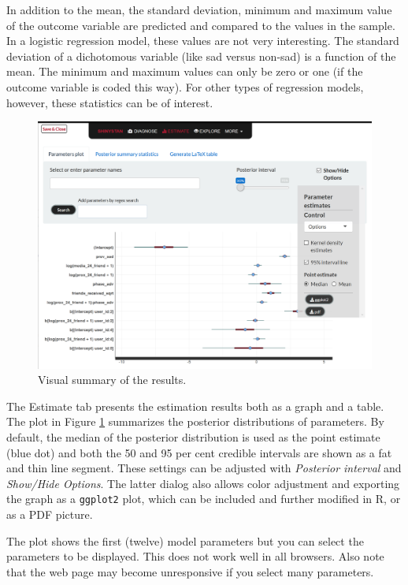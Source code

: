 \documentclass[
  english,
  doc]{apa6}
\begin{document}
In addition to the mean, the standard deviation, minimum and maximum value of the outcome variable are predicted and compared to the values in the sample. In a logistic regression model, these values are not very interesting. The standard deviation of a dichotomous variable (like sad versus non-sad) is a function of the mean. The minimum and maximum values can only be zero or one (if the outcome variable is coded this way). For other types of regression models, however, these statistics can be of interest.

\begin{figure}[H]
\includegraphics[width=1\linewidth]{shinystan5} \caption{Visual summary of the results.}\label{fig:shinystanshot5}
\end{figure}

The Estimate tab presents the estimation results both as a graph and a table. The plot in Figure \ref{fig:shinystanshot5} summarizes the posterior distributions of parameters. By default, the median of the posterior distribution is used as the point estimate (blue dot) and both the 50 and 95 per cent credible intervals are shown as a fat and thin line segment. These settings can be adjusted with \emph{Posterior interval} and \emph{Show/Hide Options}. The latter dialog also allows color adjustment and exporting the graph as a \texttt{ggplot2} plot, which can be included and further modified in R, or as a PDF picture.

The plot shows the first (twelve) model parameters but you can select the parameters to be displayed. This does not work well in all browsers. Also note that the web page may become unresponsive if you select many parameters.
\end{document}
